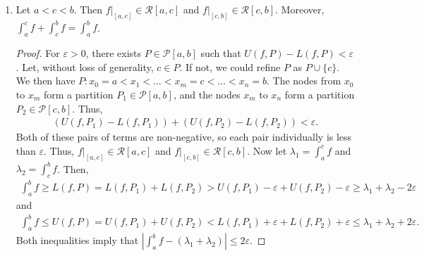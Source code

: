 \documentclass[15pt,a4paper]{book}
\theoremstyle{definition}
\newcommand{\abs}[1]{\left| #1 \right|} %
\newcommand{\cP}{\mathcal{P}}
\newcommand{\cR}{\mathcal{R}}
\begin{document}
\begin{enumerate}
\item Let $a < c < b$. Then $f|_{[a,c]} \in \cR[a,c]$ and $f|_{[c,b]} \in \cR[c,b]$. Moreover, $\int_{a}^{c} f + \int_{c}^{b} f = \int_{a}^{b} f$.

\begin{proof}
    For $\varepsilon > 0$, there exists $P \in \cP[a,b]$ such that $U(f,P) - L(f,P) < \varepsilon$. Let, without loss of generality, $c \in P$. If not, we could refine $P$ as $P \cup \{c\}$. We then have $P: x_{0} = a < x_{1} < \ldots < x_{m} = c < \ldots < x_{n} = b$. The nodes from $x_{0}$ to $x_{m}$ form a partition $P_{1} \in \cP[a,b]$, and the nodes $x_{m}$ to $x_{n}$ form a partition $P_{2} \in \cP[c,b]$. Thus,
    \begin{align}
        (U(f,P_{1})-L(f,P_{1})) + (U(f,P_{2})-L(f,P_{2})) < \varepsilon.
    \end{align}
    Both of these pairs of terms are non-negative, so each pair individually is less than $\varepsilon$. Thus, $f|_{[a,c]} \in \cR[a,c]$ and $f|_{[c,b]} \in \cR[c,b]$. Now let $\lambda_{1} = \int_{a}^{c} f$ and $\lambda_{2} = \int_{c}^{b} f$. Then,
    \begin{align}
        \int_{a}^{b} f \geq L(f,P) = L(f,P_{1}) + L(f,P_{2}) > U(f,P_{1}) - \varepsilon + U(f,P_{2}) - \varepsilon \geq \lambda_{1} + \lambda_{2} - 2\varepsilon
    \end{align}
    and
    \begin{align}
        \int_{a}^{b} f \leq U(f,P) = U(f,P_{1}) + U(f,P_{2}) < L(f,P_{1}) + \varepsilon + L(f,P_{2}) + \varepsilon \leq \lambda_{1} + \lambda_{2} + 2\varepsilon.
    \end{align}
    Both inequalities imply that $\abs{\int_{a}^{b} f - (\lambda_{1}+\lambda_{2})} \leq 2\varepsilon$.
\end{proof}

\end{enumerate}

\end{document}
